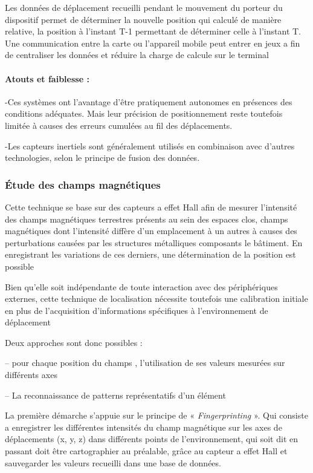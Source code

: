 \documentclass[12pt,a4paper]{report}
\begin{document}
	Les données de déplacement recueilli pendant le mouvement du porteur du dispositif permet de déterminer la nouvelle position qui calculé de manière relative, la position à l’instant T-1 permettant de déterminer celle à l’instant T. Une communication entre la carte ou l’appareil mobile peut entrer en jeux a fin de centraliser les données et réduire la charge de calcule sur le terminal
	
	
\paragraph{	Atouts et faiblesse :}
	
	-Ces systèmes ont l’avantage d’être pratiquement autonomes en présences des conditions adéquates. Mais leur précision de positionnement reste toutefois limitée à causes des erreurs cumulées au fil des déplacements.
	
	
	-Les  capteurs inertiels sont généralement utilisés en combinaison avec d’autres technologies, selon le principe de fusion des données.
	
	\subsubsection{Étude des champs magnétiques} 
	
	Cette technique se base sur des capteurs a effet Hall afin de mesurer l’intensité des champs magnétiques\cite{magnet} terrestres présents au sein des espaces clos, champs magnétiques dont l’intensité diffère d’un emplacement à un autres à causes des perturbations causées par les structures métalliques composants le bâtiment. En enregistrant les variations de ces derniers, une détermination de la position est possible
	
	
	Bien qu’elle soit indépendante de toute interaction avec des périphériques externes, cette technique de localisation nécessite toutefois une calibration initiale en plus de l’acquisition d’informations spécifiques à l’environnement de déplacement
	
	Deux approches sont donc possibles :
	
	
	– pour chaque position du champs , l'utilisation de ses valeurs mesurées sur différents axes
	
	– La reconnaissance de patterns représentatifs d’un élément
	
	La première démarche s’appuie sur le principe de « \textit{Fingerprinting} ». Qui consiste a enregistrer les différentes intensités du champ magnétique sur les axes de déplacements (x, y, z) dans différents points de l’environnement, qui soit dit en passant doit être cartographier au préalable, grâce au capteur a effet Hall et sauvegarder les valeurs recueilli dans une base de données.
	
\end{document}
